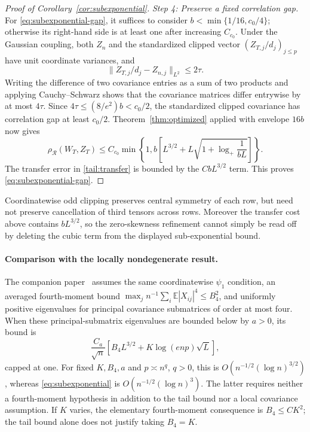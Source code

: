 \documentclass[11pt,letterpaper]{article}
\theoremstyle{remark}
\newcommand{\E}{\mathbb E}
\newcommand{\rh}{\rho_{\mathcal R}}
\begin{document}
\begin{proof}[Proof of Corollary~\ref{cor:subexponential}]
\emph{Step 4: Preserve a fixed correlation gap.}
For \eqref{eq:subexponential-gap}, it suffices to consider
\(b<\min\{1/16,c_0/4\}\); otherwise its right-hand side is at
least one after increasing \(C_{c_0}\).
Under the Gaussian coupling, both \(Z_n\) and the standardized clipped
vector \((Z_{T,j}/d_j)_{j\le p}\) have unit coordinate variances, and
\[
 \|Z_{T,j}/d_j-Z_{n,j}\|_{L^2}\le2\tau.
\]
Writing the difference of two covariance entries as a sum of two
products and applying Cauchy--Schwarz shows that the covariance matrices
differ entrywise by at most \(4\tau\). Since
\(4\tau\le(8/e^2)b<c_0/2\), the standardized clipped covariance
has correlation gap at least \(c_0/2\).
Theorem~\ref{thm:optimized} applied with envelope \(16b\) now gives
\[
 \rh(W_T,Z_T)\le C_{c_0}\min\left\{1,
 b\left[L^{3/2}+L\sqrt{1+\log_+\frac1{bL}}\right]\right\}.
\]
The transfer error in \eqref{tail:transfer} is bounded by the
\(CbL^{3/2}\) term. This proves \eqref{eq:subexponential-gap}.
\end{proof}

Coordinatewise odd clipping preserves central symmetry of each row,
but need not preserve cancellation of third tensors across rows.
Moreover the transfer cost above contains \(bL^{3/2}\), so the
zero-skewness refinement cannot simply be read off by deleting the
cubic term from the displayed sub-exponential bound.

\paragraph{Comparison with the locally nondegenerate result.}
The companion paper~\cite[Corollary~1]{Local} assumes the same
coordinatewise \(\psi_1\) condition, an averaged fourth-moment bound
\(\max_jn^{-1}\sum_i\E|X_{ij}|^4\le B_4^2\), and uniformly positive
eigenvalues for principal covariance submatrices of order at most four.
When these principal-submatrix eigenvalues are bounded below by \(a>0\), its bound is
\[
 \frac{C_a}{\sqrt n}\left[B_4L^{3/2}
                   +K\log(enp)\sqrt L\right],
\]
capped at one. For fixed \(K,B_4,a\) and \(p\asymp n^q\), \(q>0\),
this is \(O(n^{-1/2}(\log n)^{3/2})\), whereas
\eqref{eq:subexponential} is \(O(n^{-1/2}(\log n)^3)\).
The latter requires neither a fourth-moment hypothesis in addition to
the tail bound nor a local covariance assumption. If \(K\) varies,
the elementary fourth-moment consequence is \(B_4\le C K^2\);
the tail bound alone does not justify taking \(B_4=K\).
\end{document}
